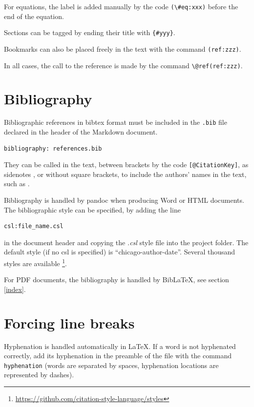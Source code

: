 \documentclass[
  12pt,
  american,
  a4paper,
  extrafontsizes,onecolumn,openright
  ]{memoir}
\begin{document}
For equations, the label is added manually by the code \texttt{(\textbackslash{}\#eq:xxx)} before the end of the equation.

Sections can be tagged by ending their title with \texttt{\{\#yyy\}}.

Bookmarks can also be placed freely in the text with the command \texttt{(ref:zzz)}.

In all cases, the call to the reference is made by the command \texttt{\textbackslash{}@ref(ref:zzz)}.

\hypertarget{bibliography}{%
\section{Bibliography}\label{bibliography}}

Bibliographic references in bibtex format must be included in the \texttt{.bib} file declared in the header of the Markdown document.

\begin{verbatim}
bibliography: references.bib
\end{verbatim}

They can be called in the text, between brackets by the code \texttt{{[}@CitationKey{]}}, as sidenotes \autocite{Xie2016}, or without square brackets, to include the authors' names in the text, such as \textcite{Xie2018} .

Bibliography is handled by pandoc when producing Word or HTML documents.
The bibliographic style can be specified, by adding the line

\begin{verbatim}
csl:file_name.csl
\end{verbatim}

in the document header and copying the \emph{.csl} style file into the project folder.
The default style (if no csl is specified) is ``chicago-author-date''.
Several thousand styles are available \footnote{\url{https://github.com/citation-style-language/styles}}.

For PDF documents, the bibliography is handled by BibLaTeX, see section \ref{index}.

\hypertarget{forcing-line-breaks}{%
\section{Forcing line breaks}\label{forcing-line-breaks}}

Hyphenation is handled automatically in LaTeX.
If a word is not hyphenated correctly, add its hyphenation in the preamble of the file with the command \texttt{hyphenation} (words are separated by spaces, hyphenation locations are represented by dashes).
\end{document}

